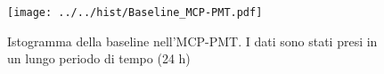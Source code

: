 \begin{figure}[h] \centering \texttt{[image: ../../hist/Baseline\_MCP-PMT.pdf]}\caption{Istogramma della baseline nell'MCP-PMT. I dati sono stati presi in un lungo periodo di tempo (24 h)}\label{hist:Baseline_MCP-PMT} \end{figure}
